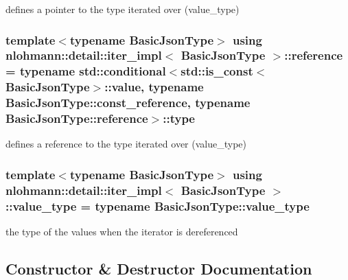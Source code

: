 defines a pointer to the type iterated over (value\+\_\+type) 

\subsubsection[{\texorpdfstring{reference}{reference}}]{\setlength{\rightskip}{0pt plus 5cm}template$<$typename Basic\+Json\+Type$>$ using {\bf nlohmann\+::detail\+::iter\+\_\+impl}$<$ Basic\+Json\+Type $>$\+::{\bf reference} =  typename std\+::conditional$<$std\+::is\+\_\+const$<$Basic\+Json\+Type$>$\+::{\bf value}, typename Basic\+Json\+Type\+::const\+\_\+reference, typename Basic\+Json\+Type\+::reference$>$\+::type}\hypertarget{classnlohmann_1_1detail_1_1iter__impl_a5be8001be099c6b82310f4d387b953ce}{}\label{classnlohmann_1_1detail_1_1iter__impl_a5be8001be099c6b82310f4d387b953ce}


defines a reference to the type iterated over (value\+\_\+type) 

\subsubsection[{\texorpdfstring{value\+\_\+type}{value_type}}]{\setlength{\rightskip}{0pt plus 5cm}template$<$typename Basic\+Json\+Type$>$ using {\bf nlohmann\+::detail\+::iter\+\_\+impl}$<$ Basic\+Json\+Type $>$\+::{\bf value\+\_\+type} =  typename Basic\+Json\+Type\+::value\+\_\+type}\hypertarget{classnlohmann_1_1detail_1_1iter__impl_ab35586a44f2222272c5346baa3013f67}{}\label{classnlohmann_1_1detail_1_1iter__impl_ab35586a44f2222272c5346baa3013f67}


the type of the values when the iterator is dereferenced 



\subsection{Constructor \& Destructor Documentation}
